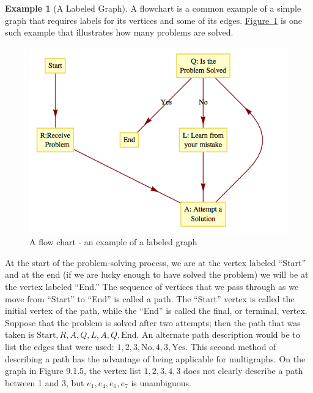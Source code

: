 \documentclass[10pt,]{book}
\theoremstyle{plain}
\theoremstyle{definition}
\theoremstyle{definition}
\theoremstyle{definition}
\newtheorem{example}[theorem]{Example}
\theoremstyle{definition}
\theoremstyle{definition}
\numberwithin{equation}{section}
\begin{document}
\begin{example}[A Labeled Graph]\label{ex-labeled-graph-9-1}
 A flowchart is a common example of a simple graph that requires labels for its vertices and some of its edges. \hyperref[fig-labeled-graph-9-1]{Figure~\ref{fig-labeled-graph-9-1}}
is one such example that illustrates how many problems are solved. 
%
\leavevmode%
\begin{figure}
\centering
\includegraphics[width=1\linewidth]{images/fig-labeled-graph-9-1.png}
\caption{A flow chart - an example of a labeled graph\label{fig-labeled-graph-9-1}}
\end{figure}
\par
At the start of the problem-solving process, we are at the vertex labeled ``Start'' and at the end (if we are lucky enough to have solved the
problem) we will be at the vertex labeled ``End.'' The sequence of vertices that we pass through as we move from ``Start'' to ``End''
is called a path. The ``Start'' vertex is called the initial vertex of the path, while the ``End'' is called the final, or terminal, vertex.
Suppose that the problem is solved after two attempts; then the path that was taken is \(\text{Start}, R, A, Q, L, A, Q, \text{End}\). An alternate
path description would be to list the edges that were used: \(1, 2, 3, \text{No}, 4, 3, \text{Yes}\). This second method of describing a path has
the advantage of being applicable for multigraphs. On the graph in Figure 9.1.5, the vertex list \(1,2,3,4,3\) does not clearly describe a path between
1 and 3, but \(e_1,e_4, e_6, e_7\) is unambiguous.%
\end{example}
\end{document}
